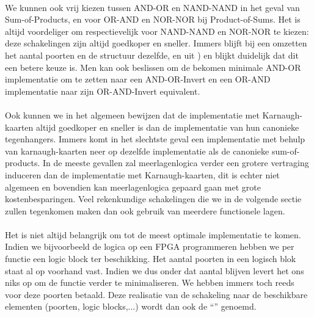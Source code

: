 \paragraph{}
We kunnen ook vrij kiezen tussen AND-OR en NAND-NAND in het geval van Sum-of-Products, en voor OR-AND en NOR-NOR bij Product-of-Sums. Het is altijd voordeliger om respectievelijk voor NAND-NAND en NOR-NOR te kiezen: deze schakelingen zijn altijd goedkoper en sneller. Immers blijft bij een omzetten het aantal poorten en de structuur dezelfde, en uit ) en  blijkt duidelijk dat dit een betere keuze is. Men kan ook beslissen om de bekomen minimale AND-OR implementatie om te zetten naar een AND-OR-Invert en een OR-AND implementatie naar zijn OR-AND-Invert equivalent.

\paragraph{}
Ook kunnen we in het algemeen bewijzen dat de implementatie met Karnaugh-kaarten altijd goedkoper en sneller is dan de implementatie van hun canonieke tegenhangers. Immers komt in het slechtste geval een implementatie met behulp van karnaugh-kaarten neer op dezelfde implementatie als de canonieke sum-of-products. In de meeste gevallen zal meerlagenlogica verder een grotere vertraging induceren dan de implementatie met Karnaugh-kaarten, dit is echter niet algemeen en bovendien kan meerlagenlogica gepaard gaan met grote kostenbesparingen. Veel rekenkundige schakelingen die we in de volgende sectie zullen tegenkomen maken dan ook gebruik van meerdere functionele lagen.

\paragraph{}
Het is niet altijd belangrijk om tot de meest optimale implementatie te komen. Indien we bijvoorbeeld de logica op een FPGA programmeren hebben we per functie een logic block ter beschikking. Het aantal poorten in een logisch blok staat al op voorhand vast. Indien we dus onder dat aantal blijven levert het ons niks op om de functie verder te minimaliseren. We hebben immers toch reeds voor deze poorten betaald. Deze realisatie van de schakeling naar de beschikbare elementen (poorten, logic blocks,...) wordt dan ook de ``'' genoemd.

